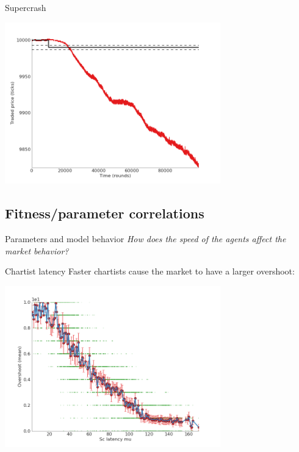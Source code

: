 \documentclass[14pt]{beamer}
\begin{document}
\begin{frame}{Supercrash}
\begin{center}
\includegraphics[width=0.7\textwidth]{market_cases/shouganai.png}
\end{center}
\end{frame}


\subsection{Fitness/parameter correlations}
\begin{frame}
\tableofcontents[currentsubsection]
\end{frame}


\begin{frame}{Parameters and model behavior}
\textit{How does the speed of the agents affect the market behavior?}
\end{frame}

\begin{frame}{Chartist latency}
Faster chartists cause the market to have a larger overshoot:
\begin{center}
\includegraphics[width=0.7\textwidth]{scatter/sc_latency_mu__vs__overshoot(mean)_scatter.png}
\end{center}
\end{frame}
\end{document}
